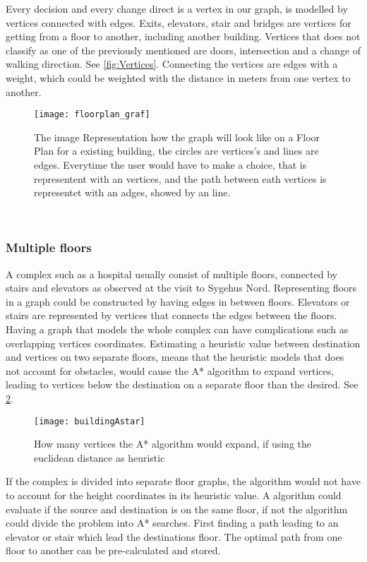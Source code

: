 Every decision and every change direct is a vertex in our graph, is modelled by vertices connected with edges. Exits, elevators, stair and bridges are vertices for getting from a floor to another, including another building. Vertices that does not classify as one of the previously mentioned are doors, intersection and a change of walking direction. See \cref{fig:Vertices}. Connecting the vertices are edges with a weight, which could be weighted with the distance in meters from one vertex to another.

\begin{figure}[ht!]
    \centering
    \texttt{[image: floorplan\_graf]}
    \caption{The image Representation how the graph will look like on a Floor Plan for a existing building, the circles are vertices's and lines are edges. Everytime the user would have to make a choice, that is representent with an vertices, and the path between eath vertices is representet with an adges, showed by an line.}
    \label{fig:floorplan_graf}
  \end{figure}
\

\subsubsection{Multiple floors}

A complex such as a hospital usually consist of multiple floors, connected by stairs and elevators as observed at the visit to Sygehus Nord. Representing floors in a graph could be constructed by having edges in between floors. Elevators or stairs are represented by vertices that connects the edges between the floors. Having a graph that models the whole complex can have complications such as overlapping vertices coordinates. Estimating a heuristic value between destination and vertices on two separate floors, means that the heuristic models that does not account for obstacles, would cause the A* algorithm to expand vertices, leading to vertices below the destination on a separate floor than the desired. See \cref{fig:buildingAstar}.

\begin{figure}[ht!]
    \centering
    \texttt{[image: buildingAstar]}
    \caption{How many vertices the A* algorithm would expand, if using the euclidean distance as heuristic}
    \label{fig:buildingAstar}
  \end{figure}

If the complex is divided into separate floor graphs, the algorithm would not have to account for the height coordinates in its heuristic value. A algorithm could evaluate if the source and destination is on the same floor, if not the algorithm could divide the problem into A* searches. First finding a path leading to an elevator or stair which lead the destinations floor. The optimal path from one floor to another can be pre-calculated and stored. 

